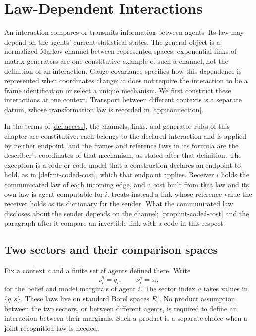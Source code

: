 \chapter{Law-Dependent Interactions}
\label{ch:interactions}

An interaction compares or transmits information between agents. Its law may depend on the agents' current statistical states. The general object is a normalized Markov channel between represented spaces; exponential links of matrix generators are one constitutive example of such a channel, not the definition of an interaction. Gauge covariance specifies how this dependence is represented when coordinates change; it does not require the interaction to be a frame identification or select a unique mechanism. We first construct these interactions at one context. Transport between different contexts is a separate datum, whose transformation law is recorded in \cref{app:connection}.

In the terms of \cref{def:access}, the channels, links, and generator rules of this chapter are constitutive: each belongs to the declared interaction and is applied by neither endpoint, and the frames and reference laws in its formula are the describer's coordinates of that mechanism, as stated after that definition. The exception is a code or code model that a construction declares an endpoint to hold, as in \cref{def:int-coded-cost}, which that endpoint applies. Receiver $i$ holds the communicated law of each incoming edge, and a cost built from that law and its own law is agent-computable for $i$.  treats instead a link whose reference value the receiver holds as its dictionary for the sender. What the communicated law discloses about the sender depends on the channel; \cref{prop:int-coded-cost} and the paragraph after it compare an invertible link with a code in this respect.

\section{Two sectors and their comparison spaces}

Fix a context $c$ and a finite set of agents defined there. Write
\begin{equation}
\nu_i^q=q_i,\qquad \nu_i^s=s_i,
\end{equation}
for the belief and model marginals of agent $i$. The sector index $a$ takes values in $\{q,s\}$. These laws live on standard Borel spaces $E_i^a$. No product assumption between the two sectors, or between different agents, is required to define an interaction between their marginals. Such a product is a separate choice when a joint recognition law is needed.

